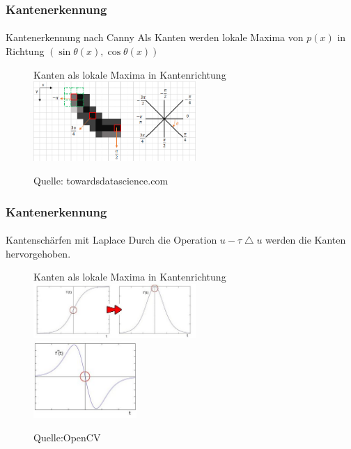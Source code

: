 \documentclass{beamer}
\begin{document}
\begin{frame}
    \frametitle{Kantenerkennung}
\framesubtitle{}
\begin{block}{Kantenerkennung nach Canny}
Als Kanten werden lokale Maxima von $p(x)$ in Richtung $(\sin \theta(x), \cos \theta(x)  )$
\end{block}
\begin{figure}[htp]
      \centering
Kanten als lokale Maxima in Kantenrichtung \\
    \includegraphics[width=0.55\textwidth]{images/canny_max} 
      \caption{Quelle: towardsdatascience.com}
\end{figure}

 \end{frame}




\begin{frame}
    \frametitle{Kantenerkennung}
\framesubtitle{}
\begin{block}{Kantenschärfen mit Laplace}
Durch die Operation $u - \tau \bigtriangleup u$ werden die Kanten hervorgehoben.
\end{block}
\begin{figure}[htp]
      \centering
Kanten als lokale Maxima in Kantenrichtung \\
    \includegraphics[width=0.55\textwidth]{images/laplace1} \\
    \includegraphics[width=0.35\textwidth]{images/laplace2} 
      \caption{Quelle:OpenCV}
\end{figure}
 \end{frame}
\end{document}
